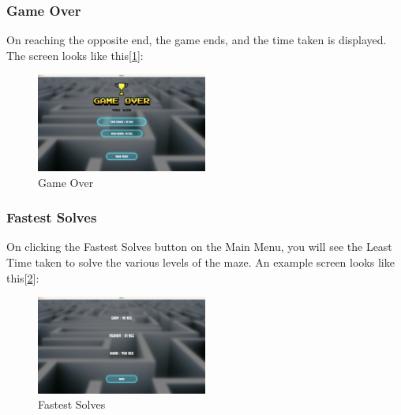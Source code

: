 \documentclass[10pt]{article}
\begin{document}
    \subsubsection{Game Over}
    On reaching the opposite end, the game ends, and the time taken is displayed.
    The screen looks like this[\ref{fig:GameOver}]:
    \begin{figure}[h!]
        \centering
        \includegraphics[width=0.5\textwidth]{GameOver}
        \caption{Game Over}\label{fig:GameOver}
    \end{figure}

    \subsubsection{Fastest Solves}
    On clicking the Fastest Solves button on the Main Menu, you will see the Least Time taken to solve the various levels of the maze.
    An example screen looks like this[\ref{fig:HighScores}]:
    \begin{figure}[h!]
        \centering
        \includegraphics[width=0.5\textwidth]{HighScores}
        \caption{Fastest Solves}\label{fig:HighScores}
    \end{figure}
\end{document}

